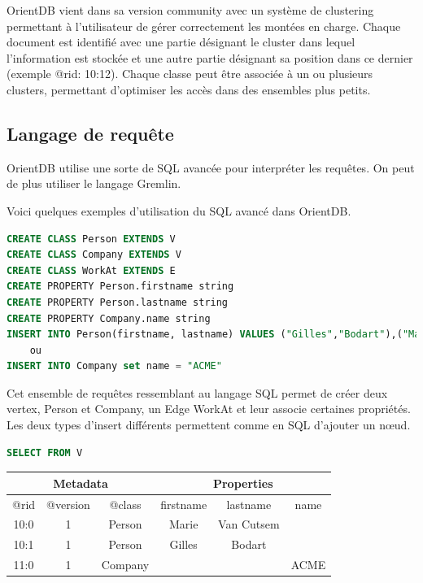 \documentclass[a4paper,fleqn,12pt]{report}
\begin{document}
OrientDB vient dans sa version community avec un système de clustering permettant à l’utilisateur de gérer correctement les montées en charge. Chaque document est identifié avec une partie désignant le cluster dans lequel l’information est stockée et une autre partie désignant sa position dans ce dernier (exemple @rid: 10:12). Chaque classe peut être associée à un ou plusieurs clusters, permettant d’optimiser les accès dans des ensembles plus petits.


\subsection{Langage de requête}

OrientDB utilise une sorte de SQL avancée pour interpréter les requêtes. On peut de plus utiliser le langage Gremlin.

Voici quelques exemples d'utilisation du SQL avancé dans OrientDB.

\begin{lstlisting}[language=SQL]
CREATE CLASS Person EXTENDS V
CREATE CLASS Company EXTENDS V
CREATE CLASS WorkAt EXTENDS E
CREATE PROPERTY Person.firstname string
CREATE PROPERTY Person.lastname string
CREATE PROPERTY Company.name string
INSERT INTO Person(firstname, lastname) VALUES ("Gilles","Bodart"),("Marie","Van Cutsem")
	ou
INSERT INTO Company set name = "ACME"

\end{lstlisting}

Cet ensemble de requêtes ressemblant au langage SQL permet de créer deux vertex, Person et Company, un Edge WorkAt et leur associe certaines propriétés. Les deux types d’insert différents permettent comme en SQL d’ajouter un nœud.

\begin{lstlisting}[language=SQL]
SELECT FROM V
\end{lstlisting}
\begin{center}
	\begin{tabular}{|c|c|c|c|c|c|}
   		\hline
  		\multicolumn{3}{|c|}{Metadata} & \multicolumn{3}{c|}{Properties} \\
   		\hline
   		@rid & @version & @class & firstname & lastname & name \\
   		\hline
   		10:0 & 1 & Person & Marie & Van Cutsem &  \\
   		10:1 & 1 & Person & Gilles & Bodart &  \\
   		11:0 & 1 & Company &  &  & ACME \\
   		\hline
	\end{tabular}
\end{center}
\end{document}

